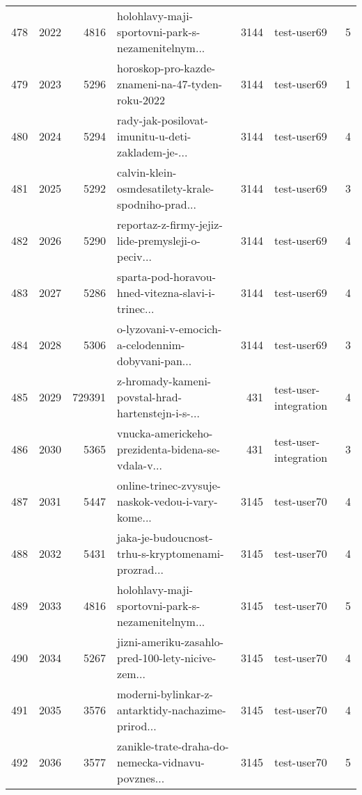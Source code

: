 \begin{tabular}{lrrlrlr}
478  &       2022 &     4816 &  holohlavy-maji-sportovni-park-s-nezamenitelnym... &     3144 &                  test-user69 &               5 \\
479  &       2023 &     5296 &   horoskop-pro-kazde-znameni-na-47-tyden-roku-2022 &     3144 &                  test-user69 &               1 \\
480  &       2024 &     5294 &  rady-jak-posilovat-imunitu-u-deti-zakladem-je-... &     3144 &                  test-user69 &               4 \\
481  &       2025 &     5292 &  calvin-klein-osmdesatilety-krale-spodniho-prad... &     3144 &                  test-user69 &               3 \\
482  &       2026 &     5290 &  reportaz-z-firmy-jejiz-lide-premysleji-o-peciv... &     3144 &                  test-user69 &               4 \\
483  &       2027 &     5286 &  sparta-pod-horavou-hned-vitezna-slavi-i-trinec... &     3144 &                  test-user69 &               4 \\
484  &       2028 &     5306 &  o-lyzovani-v-emocich-a-celodennim-dobyvani-pan... &     3144 &                  test-user69 &               3 \\
485  &       2029 &   729391 &  z-hromady-kameni-povstal-hrad-hartenstejn-i-s-... &      431 &        test-user-integration &               4 \\
486  &       2030 &     5365 &  vnucka-americkeho-prezidenta-bidena-se-vdala-v... &      431 &        test-user-integration &               3 \\
487  &       2031 &     5447 &  online-trinec-zvysuje-naskok-vedou-i-vary-kome... &     3145 &                  test-user70 &               4 \\
488  &       2032 &     5431 &  jaka-je-budoucnost-trhu-s-kryptomenami-prozrad... &     3145 &                  test-user70 &               4 \\
489  &       2033 &     4816 &  holohlavy-maji-sportovni-park-s-nezamenitelnym... &     3145 &                  test-user70 &               5 \\
490  &       2034 &     5267 &  jizni-ameriku-zasahlo-pred-100-lety-nicive-zem... &     3145 &                  test-user70 &               4 \\
491  &       2035 &     3576 &  moderni-bylinkar-z-antarktidy-nachazime-prirod... &     3145 &                  test-user70 &               4 \\
492  &       2036 &     3577 &  zanikle-trate-draha-do-nemecka-vidnavu-povznes... &     3145 &                  test-user70 &               5 \\

\end{tabular}
